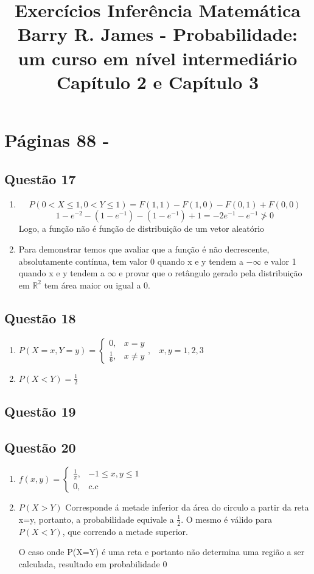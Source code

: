 \documentclass[a4paper,12pt]{report}
\author{}
\title{Exercícios Inferência Matemática\\
Barry R. James - Probabilidade: um curso em nível intermediário\\
Capítulo 2 e Capítulo 3
}
\date{}
\begin{document}
	\maketitle
	\tableofcontents	
	\newpage
	
	
	\chapter{Páginas 88 - }
	\section{Questão 17}
	 \begin{enumerate}[label=\alph*)]
	 	\item 
	 	$$P(0<X\le 1 , 0 <Y\le 1) = F(1,1) - F(1,0)-F(0,1)+F(0,0) $$
	 	$$1-e^{-2} - (1-e^{-1})  - (1-e^{-1}) + 1 = -2e^{-1} -e^{-1}\not>0 $$
	 	Logo, a função não é função de distribuição de um vetor aleatório
	 	
	 	\item Para demonstrar temos que avaliar que a função é não decrescente, absolutamente contínua, tem valor 0 quando x e y tendem a $-\infty$ e valor 1 quando x e y tendem a $\infty$ e provar que  o  retângulo gerado pela distribuição em $\mathbb R^2$ tem área maior ou igual a 0.
	 \end{enumerate}
	 		\section{Questão 18}

 	
	 	\begin{enumerate}[label=\alph*)]
	 		\item  $P(X=x,Y=y)=\begin{cases}
	 			0, & x=y\\
	 			\frac{1}{6}, & x\ne y
	 		\end{cases}, \ \ \ \  x,y=1,2,3$
	 			 	\item  $P(X<Y) = \frac{1}{2}$
	 	\end{enumerate}
	 	
	\section{Questão 19}
	
		\section{Questão 20}
		\begin{enumerate}[label=\alph*)]
			\item $f(x,y)=\begin{cases}
			\frac{1}{\pi}, & -1\le x,y\le 1\\
			0, & c.c
			\end{cases}$
			\item $P(X>Y)$ Corresponde á metade inferior da área do circulo a partir da reta x=y, portanto, a probabilidade equivale a  $\frac{1}{2}$. O mesmo é válido para $P(X<Y)$, que correndo a metade superior.
			
			O caso onde P(X=Y) é uma reta e portanto não determina uma região a ser calculada, resultado em probabilidade 0
		\end{enumerate}
	
\end{document}
